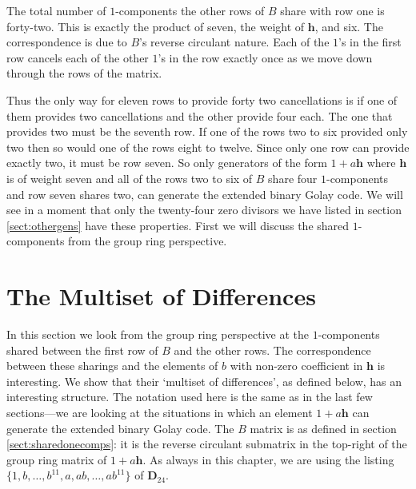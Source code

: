 The total number of $1$-components the other rows of $B$ share with row one is forty-two.
This is exactly the product of seven, the weight of $\mathbf{h}$, and six.
The correspondence is due to $B$'s reverse circulant nature.
Each of the $1$'s in the first row cancels each of the other $1$'s in the row exactly once as we move down through the rows of the matrix.

Thus the only way for eleven rows to provide forty two cancellations is if one of them provides two cancellations and the other provide four each.
The one that provides two must be the seventh row.
If one of the rows two to six provided only two then so would one of the rows eight to twelve.
Since only one row can provide exactly two, it must be row seven.
So only generators of the form $1+ a \mathbf{h}$ where $\mathbf{h}$ is of weight seven and all of the rows two to six of $B$ share four $1$-components and row seven shares two, can generate the extended binary Golay code.
We will see in a moment that only the twenty-four zero divisors we have listed in section \ref{sect:othergens} have these properties.
First we will discuss the shared $1$-components from the group ring perspective.

\section{The Multiset of Differences}
\label{sect:multidiffs}
In this section we look from the group ring perspective at the $1$-components shared between the first row of $B$ and the other rows.
The correspondence between these sharings and the elements of $b$ with non-zero coefficient in $\mathbf{h}$ is interesting.
We show that their `multiset of differences', as defined below, has an interesting structure.
The notation used here is the same as in the last few sections---we are looking at the situations in which an element $1+a \mathbf{h}$ can generate the extended binary Golay code.
The $B$ matrix is as defined in section \ref{sect:sharedonecomps}: it is the reverse circulant submatrix in the top-right of the group ring matrix of $1+ a \mathbf{h}$.
As always in this chapter, we are using the listing $\{ 1 , b, \ldots , b^{11} , a , ab , \ldots , ab^{11} \}$ of $\mathbf{D}_{24}$.

